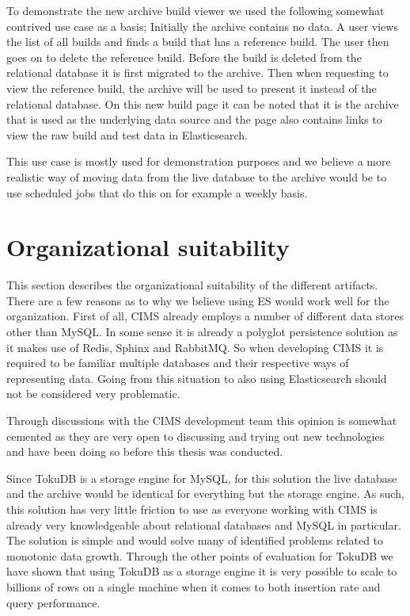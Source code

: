 To demonstrate the new archive build viewer we used the following somewhat contrived use case as a basis; Initially the archive contains no data. A user views the list of all builds and finds a build that has a reference build. The user then goes on to delete the reference build. Before the build is deleted from the relational database it is first migrated to the archive. Then when requesting to view the reference build, the archive will be used to present it instead of the relational database. On this new build page it can be noted that it is the archive that is used as the underlying data source and the page also contains links to view the raw build and test data in Elasticsearch.

This use case is mostly used for demonstration purposes and we believe a more realistic way of moving data from the live database to the archive would be to use scheduled jobs that do this on for example a weekly basis.

\section{Organizational suitability}
This section describes the organizational suitability of the different artifacts.
There are a few reasons as to why we believe using ES would work well for the organization. First of all, CIMS already employs a number of different data stores other than MySQL. In some sense it is already a polyglot persistence solution as it makes use of Redis, Sphinx and RabbitMQ. So when developing CIMS it is required to be familiar multiple databases and their respective ways of representing data. Going from this situation to also using Elasticsearch should not be considered very problematic.

Through discussions with the CIMS development team this opinion is somewhat cemented as they are very open to discussing and trying out new technologies and have been doing so before this thesis was conducted.

Since TokuDB is a storage engine for MySQL, for this solution the live database and the archive would be identical for everything but the storage engine. As such, this solution has very little friction to use as everyone working with CIMS is already very knowledgeable about relational databases and MySQL in particular. The solution is simple and would solve many of identified problems related to monotonic data growth. Through the other points of evaluation for TokuDB we have shown that using TokuDB as a storage engine it is very possible to scale to billions of rows on a single machine when it comes to both insertion rate and query performance.